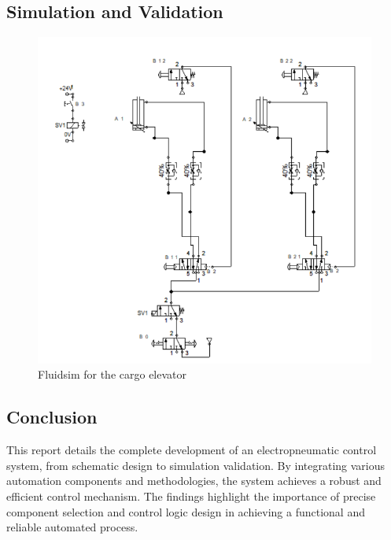 \subsection{Simulation and Validation} \label{sec:Simulation_and_Validation}

\begin{figure}[H]
    \includegraphics[width=16cm]{Images/Q4/fluidsim.png}
    \centering
    \caption{Fluidsim for the cargo elevator}
    \label{fig:fluidsim}
\end{figure}

\subsection{Conclusion}

This report details the complete development of an electropneumatic control system, from schematic 
design to simulation validation. By integrating various automation components and methodologies, 
the system achieves a robust and efficient control mechanism. The findings highlight the importance 
of precise component selection and control logic design in achieving a functional and reliable 
automated process.